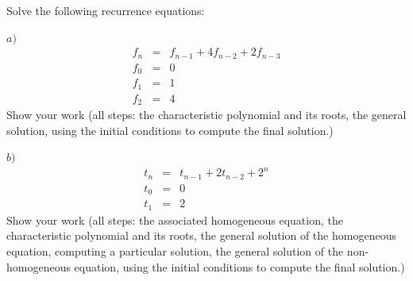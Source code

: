 \documentclass[11pt]{article}
\begin{document}
\newpage
\begin{problem}
	Solve the following recurrence equations:

%
$a)$
\begin{eqnarray*}
        f_n &=& f_{n-1} + 4f_{n-2} + 2f_{n-3}\\
        f_0 &=& 0 \\
        f_1 &=& 1 \\
		f_2 &=& 4 
\end{eqnarray*}
%
Show your work (all steps: the characteristic polynomial and its roots, the general solution, 
using the initial conditions to compute the final solution.)


$b)$
\begin{eqnarray*}
        t_n &=& t_{n-1} + 2t_{n-2} + 2^n\\
        t_0 &=& 0 \\
        t_1 &=& 2
\end{eqnarray*}
%
Show your work (all steps: the associated homogeneous equation,
the characteristic polynomial and its
roots, the general solution of the homogeneous
equation, computing a particular solution,
the general solution of the non-homogeneous equation,
using the initial conditions to compute the final solution.)
%
\end{problem}
\end{document}
